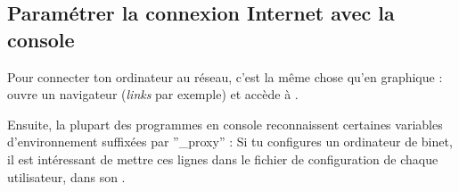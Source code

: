 \subsection{Paramétrer la connexion Internet avec la console}
\label{linux_cmdline}
Pour connecter ton ordinateur au réseau, c'est la même chose qu'en graphique : ouvre un navigateur (\emph{links} par exemple) et accède à .

%
%
%
Ensuite, la plupart des programmes en console reconnaissent certaines variables d'environnement suffixées par ''\_proxy'' :
\noindent {}
Si tu configures un ordinateur de binet, il est intéressant de mettre ces lignes dans le fichier de configuration de chaque utilisateur, dans son .
